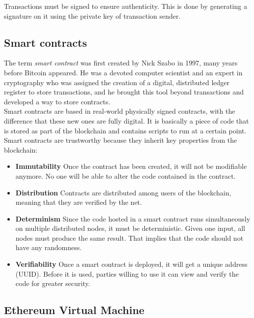 \documentclass[10pt]{article}
\begin{document}
\begin{multicols}{2}
Transactions must be signed to ensure authenticity. This is done by generating a signature on it using the private key of transaction sender. 

\subsection{Smart contracts}

The term \textit{smart contract} was first created by Nick Szabo in 1997, many years before Bitcoin appeared. He was a devoted computer scientist and an expert in cryptography who was assigned the creation of a digital, distributed ledger register to store transactions, and he brought this tool beyond transactions and developed a way to store contracts.\\

Smart contracts are based in real-world physically signed contracts, with the difference that these new ones are fully digital. It is basically a piece of code that is stored as part of the blockchain and contains scripts to run at a certain point.\\

Smart contracts are trustworthy because they inherit key properties from the blockchain:

\begin{itemize}
	\item \textbf{Immutability} Once the contract has been created, it will not be modifiable anymore. No one will be able to alter the code contained in the contract.
	\item \textbf{Distribution} Contracts are distributed among users of the blockchain, meaning that they are verified by the net.
	\item \textbf{Determinism} Since the code hosted in a smart contract runs simultaneously on multiple distributed nodes, it must be deterministic. Given one input, all nodes must produce the same result. That implies that the code should not have any randomness.
	\item \textbf{Verifiability} Once a smart contract is deployed, it will get a unique address (UUID). Before it is used, parties willing to use it can view and verify the code for greater security.
\end{itemize}

\subsection{Ethereum Virtual Machine}


\end{multicols}
\end{document}
